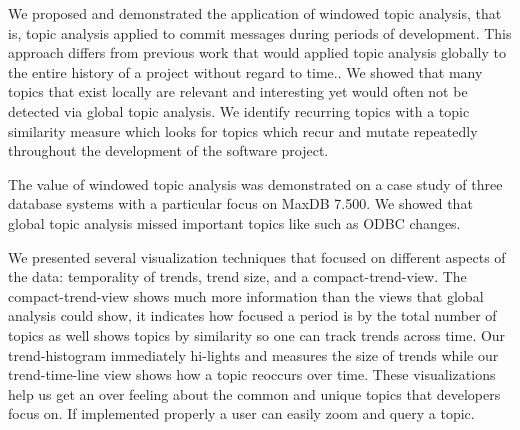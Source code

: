 \documentclass[times, 10pt,twocolumn]{article}
\begin{document}






We proposed and demonstrated the application of windowed topic
analysis, that is, topic analysis applied to commit messages during
periods of development. This approach differs from previous work that
would applied topic analysis globally to the entire history of a
project without regard to time.. We showed that many topics that exist
locally are relevant and interesting yet would often not be detected
via global topic analysis. We identify recurring topics with a topic
similarity measure which looks for topics which recur and mutate
repeatedly throughout the development of the software project.

The value of windowed topic analysis was demonstrated on a case study
of three database systems with a particular focus on MaxDB 7.500. We
showed that global topic analysis missed important topics like such as
ODBC changes.



We presented several visualization techniques that focused on
different aspects of the data: temporality of trends, trend size, and
a compact-trend-view. The compact-trend-view shows much more
information than the views that global analysis could show, it
indicates how focused a period is by the total number of topics as
well shows topics by similarity so one can track trends across time.
Our trend-histogram immediately hi-lights and measures the size of
trends while our trend-time-line view shows how a topic reoccurs over
time. These visualizations help us get an over feeling about the
common and unique topics that developers focus on. If implemented
properly a user can easily zoom and query a topic.
\end{document}
